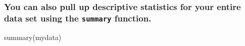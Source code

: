\documentclass[
]{book}
\newenvironment{Shaded}{\begin{snugshade}}{\end{snugshade}}
\newcommand{\FunctionTok}[1]{\textcolor[rgb]{0.00,0.00,0.00}{#1}}
\newcommand{\NormalTok}[1]{#1}
\begin{document}
\hypertarget{descriptive}{%
\subsubsection*{\texorpdfstring{You can also pull up descriptive statistics for your entire data set using the \texttt{summary} function.}{You can also pull up descriptive statistics for your entire data set using the summary function.}}\label{descriptive}}

\begin{Shaded}
\begin{Highlighting}[]
\FunctionTok{summary}\NormalTok{(mydata)}
\end{Highlighting}
\end{Shaded}
\end{document}
